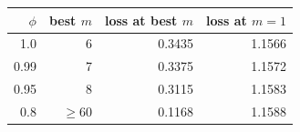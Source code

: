 \begin{tabular}{rrrr}
\toprule
$\phi$ & best $m$ & loss at best $m$ & loss at $m{=}1$ \\
\midrule
1.0 & 6 & 0.3435 & 1.1566 \\
0.99 & 7 & 0.3375 & 1.1572 \\
0.95 & 8 & 0.3115 & 1.1583 \\
0.8 & $\ge 60$ & 0.1168 & 1.1588 \\
\bottomrule
\end{tabular}
